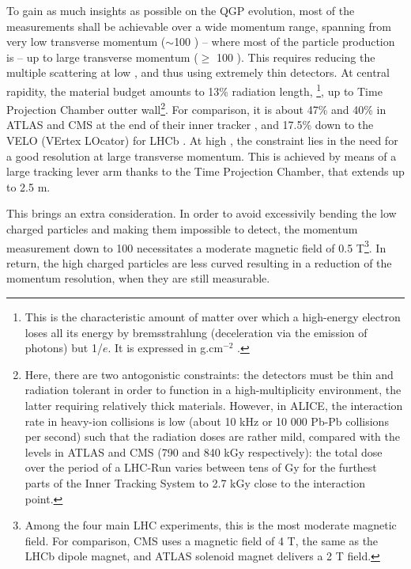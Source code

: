 To gain as much insights as possible on the QGP evolution, most of the measurements shall be achievable over a wide momentum range, spanning from very low transverse momentum ($\sim$100 \mmom) -- where most of the particle production is -- up to large transverse momentum ($\geq$ 100 \gmom). This requires reducing the multiple scattering at low \pT, and thus using extremely thin detectors. At central rapidity, the material budget amounts to 13\% radiation length, \Xzero\footnote{This is the characteristic amount of matter over which a high-energy electron loses all its energy by bremsstrahlung (\ie deceleration via the emission of photons) but 1/$e$. It is expressed in g.cm$^{-2}$ \cite{particledatagroupReviewParticlePhysics2022}.}, up to Time Projection Chamber outter wall\footnote{Here, there are two antogonistic constraints: the detectors must be thin and radiation tolerant in order to function in a high-multiplicity environment, the latter requiring relatively thick materials. However, in ALICE, the interaction rate in heavy-ion collisions is low (about 10 kHz or 10 000 Pb-Pb collisions per second) such that the radiation doses are rather mild, compared with the levels in ATLAS and CMS (790 and 840 kGy respectively): the total dose over the period of a LHC-Run varies between tens of Gy for the furthest parts of the Inner Tracking System to 2.7 kGy close to the interaction point.}. For comparison, it is about 47\% and 40\% \Xzero in ATLAS and CMS at the end of their inner tracker \cite{aadATLASExperimentCERN2008}\cite{cmscollaborationCMSExperimentCERN2008}, and 17.5\% \Xzero down to the VELO (VErtex LOcator) for LHCb \cite{lhcbcollaborationLHCbDetectorLHC2008}. At high \pT, the constraint lies in the need for a good resolution at large transverse momentum. This is achieved by means of a large tracking lever arm thanks to the Time Projection Chamber, that extends up to 2.5 m. 

This brings an extra consideration. In order to avoid excessivily bending the low \pT charged particles and making them impossible to detect, the momentum measurement down to 100 \mmom necessitates a moderate magnetic field of 0.5 T\footnote{Among the four main LHC experiments, this is the most moderate magnetic field. For comparison, CMS uses a magnetic field of 4 T, the same as the LHCb dipole magnet, and ATLAS solenoid magnet delivers a 2 T field.}. In return, the high \pT charged particles are less curved resulting in a reduction of the momentum resolution, when they are still measurable. 

